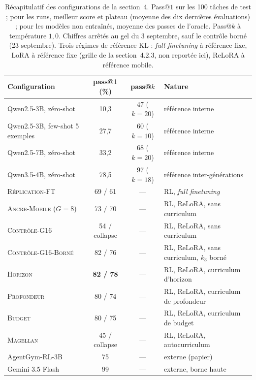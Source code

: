 \documentclass[11pt,a4paper]{article}
\begin{document}
\begin{table}[htbp]
\centering
\caption{Récapitulatif des configurations de la section~4. Pass@$1$ sur les 100 tâches de test ; pour les runs, meilleur score et plateau (moyenne des dix dernières évaluations) ; pour les modèles non entraînés, moyenne des passes de l'oracle. Pass@$k$ à température $1{,}0$. Chiffres arrêtés au gel du 3 septembre, sauf le contrôle borné (23 septembre). Trois régimes de référence KL : \emph{full finetuning} à référence fixe, LoRA à référence fixe (grille de la section~4.2.3, non reportée ici), ReLoRA à référence mobile.}
\label{tab:recap_section4}
\small
\begin{tabular}{l c c l}
\toprule
\textbf{Configuration} & \textbf{pass@1 (\%)} & \textbf{pass@$k$} & \textbf{Nature} \\
\midrule
Qwen2.5-3B, zéro-shot & 10{,}3 & 47 ($k{=}20$) & référence interne \\
Qwen2.5-3B, few-shot 5 exemples & 27{,}7 & 60 ($k{=}10$) & référence interne \\
Qwen2.5-7B, zéro-shot & 33{,}2 & 68 ($k{=}20$) & référence interne \\
Qwen3.5-4B, zéro-shot & 78{,}5 & 97 ($k{=}18$) & référence inter-générations \\
\textsc{Réplication-FT} & 69 / 61 & --- & RL, \emph{full finetuning} \\
\textsc{Ancre-Mobile} ($G{=}8$) & 73 / 70 & --- & RL, ReLoRA, sans curriculum \\
\textsc{Contrôle-G16} & 54 / collapse & --- & RL, ReLoRA, sans curriculum \\
\textsc{Contrôle-G16-Borné} & 82 / 76 & --- & RL, ReLoRA, sans curriculum, $k_3$ borné \\
\textsc{Horizon} & \textbf{82 / 78} & --- & RL, ReLoRA, curriculum d'horizon \\
\textsc{Profondeur} & 80 / 74 & --- & RL, ReLoRA, curriculum de profondeur \\
\textsc{Budget} & 80 / 75 & --- & RL, ReLoRA, curriculum de budget \\
\textsc{Magellan} & 45 / collapse & --- & RL, ReLoRA, autocurriculum \\
AgentGym-RL-3B & 75 & --- & externe (papier) \\
Gemini 3.5 Flash & 99 & --- & externe, borne haute \\
\bottomrule
\end{tabular}
\end{table}
\end{document}
